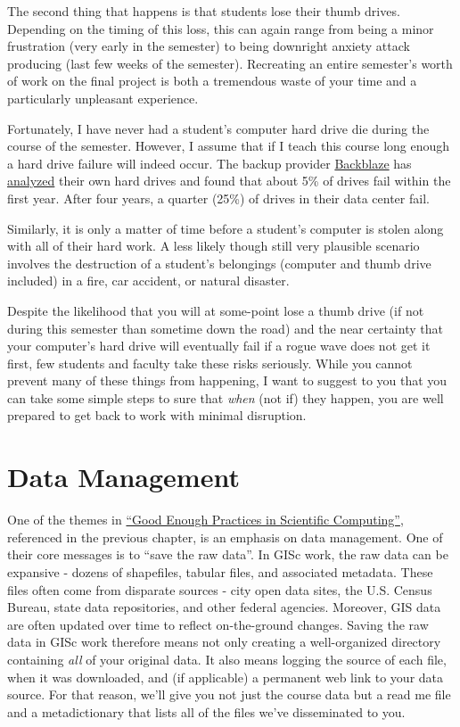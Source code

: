 \documentclass[]{book}
\theoremstyle{definition}
\theoremstyle{definition}
\theoremstyle{remark}
\begin{document}
The second thing that happens is that students lose their thumb drives.
Depending on the timing of this loss, this can again range from being a
minor frustration (very early in the semester) to being downright
anxiety attack producing (last few weeks of the semester). Recreating an
entire semester's worth of work on the final project is both a
tremendous waste of your time and a particularly unpleasant experience.

Fortunately, I have never had a student's computer hard drive die during
the course of the semester. However, I assume that if I teach this
course long enough a hard drive failure will indeed occur. The backup
provider \href{https://www.backblaze.com/}{Backblaze} has
\href{https://www.backblaze.com/blog/how-long-do-disk-drives-last/}{analyzed}
their own hard drives and found that about 5\% of drives fail within the
first year. After four years, a quarter (25\%) of drives in their data
center fail.

Similarly, it is only a matter of time before a student's computer is
stolen along with all of their hard work. A less likely though still
very plausible scenario involves the destruction of a student's
belongings (computer and thumb drive included) in a fire, car accident,
or natural disaster.

Despite the likelihood that you will at some-point lose a thumb drive
(if not during this semester than sometime down the road) and the near
certainty that your computer's hard drive will eventually fail if a
rogue wave does not get it first, few students and faculty take these
risks seriously. While you cannot prevent many of these things from
happening, I want to suggest to you that you can take some simple steps
to sure that \emph{when} (not if) they happen, you are well prepared to
get back to work with minimal disruption.

\section{Data Management}\label{data-management}

One of the themes in \href{https://arxiv.org/abs/1609.00037}{``Good
Enough Practices in Scientific Computing''}, referenced in the previous
chapter, is an emphasis on data management. One of their core messages
is to ``save the raw data''. In GISc work, the raw data can be expansive
- dozens of shapefiles, tabular files, and associated metadata. These
files often come from disparate sources - city open data sites, the U.S.
Census Bureau, state data repositories, and other federal agencies.
Moreover, GIS data are often updated over time to reflect on-the-ground
changes. Saving the raw data in GISc work therefore means not only
creating a well-organized directory containing \emph{all} of your
original data. It also means logging the source of each file, when it
was downloaded, and (if applicable) a permanent web link to your data
source. For that reason, we'll give you not just the course data but a
read me file and a metadictionary that lists all of the files we've
disseminated to you.
\end{document}
